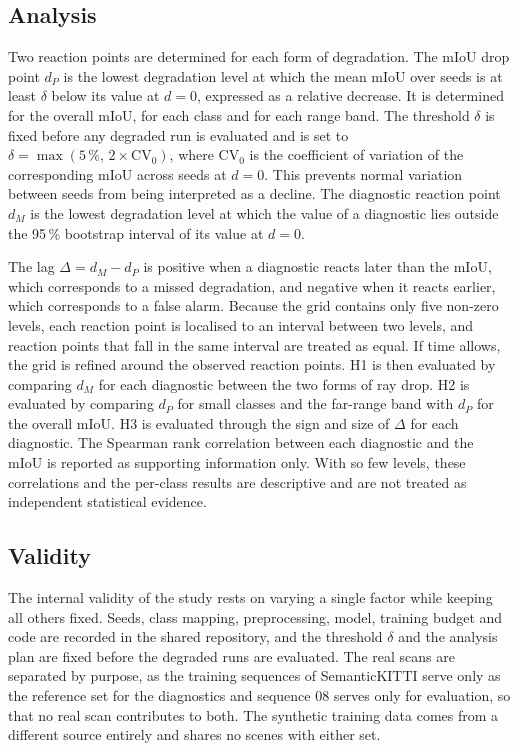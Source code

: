 \subsection{Analysis}\label{sec:analysis}
Two reaction points are determined for each form of degradation. The mIoU drop point $d_P$ is the lowest degradation level at which the mean mIoU over seeds is at least $\delta$ below its value at $d=0$, expressed as a relative decrease. It is determined for the overall mIoU, for each class and for each range band. The threshold $\delta$ is fixed before any degraded run is evaluated and is set to $\delta=\max(5\,\%,\,2\times\mathrm{CV}_0)$, where $\mathrm{CV}_0$ is the coefficient of variation of the corresponding mIoU across seeds at $d=0$. This prevents normal variation between seeds from being interpreted as a decline. The diagnostic reaction point $d_M$ is the lowest degradation level at which the value of a diagnostic lies outside the 95\,\% bootstrap interval of its value at $d=0$.

The lag $\Delta=d_M-d_P$ is positive when a diagnostic reacts later than the mIoU, which corresponds to a missed degradation, and negative when it reacts earlier, which corresponds to a false alarm. Because the grid contains only five non-zero levels, each reaction point is localised to an interval between two levels, and reaction points that fall in the same interval are treated as equal. If time allows, the grid is refined around the observed reaction points. H1 is then evaluated by comparing $d_M$ for each diagnostic between the two forms of ray drop. H2 is evaluated by comparing $d_P$ for small classes and the far-range band with $d_P$ for the overall mIoU. H3 is evaluated through the sign and size of $\Delta$ for each diagnostic. The Spearman rank correlation between each diagnostic and the mIoU is reported as supporting information only. With so few levels, these correlations and the per-class results are descriptive and are not treated as independent statistical evidence.

\subsection{Validity}\label{sec:validity}
The internal validity of the study rests on varying a single factor while keeping all others fixed. Seeds, class mapping, preprocessing, model, training budget and code are recorded in the shared repository, and the threshold $\delta$ and the analysis plan are fixed before the degraded runs are evaluated. The real scans are separated by purpose, as the training sequences of SemanticKITTI serve only as the reference set for the diagnostics and sequence 08 serves only for evaluation, so that no real scan contributes to both. The synthetic training data comes from a different source entirely and shares no scenes with either set.

